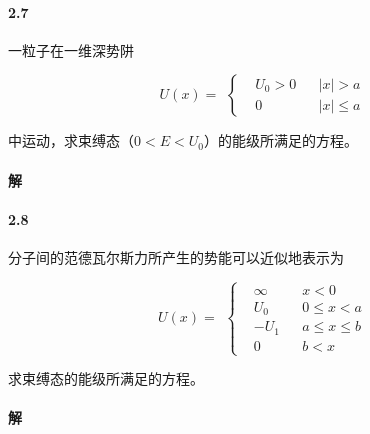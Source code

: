 \documentclass{article}
\begin{document}
\paragraph{2.7}

一粒子在一维深势阱

\begin{equation*}
  \begin{aligned}
    U \left( x \right) =
  \end{aligned}
  \left\{
  \begin{aligned}
    & U_0 > 0 && \left| x \right| > a \\
    & 0 && \left| x \right| \leq a
  \end{aligned}
  \right.
\end{equation*}

中运动，求束缚态（$0<E<U_0$）的能级所满足的方程。

\paragraph{解}

\paragraph{2.8}

分子间的范德瓦尔斯力所产生的势能可以近似地表示为

\begin{equation*}
  \begin{aligned}
    U \left( x  \right) = 
  \end{aligned}
  \left\{
  \begin{aligned}
    & \infty && x<0 \\
    & U_0 && 0 \leq x < a \\
    & - U_1 && a \leq x \leq b \\
    & 0 && b < x
  \end{aligned}
  \right.
\end{equation*}

求束缚态的能级所满足的方程。

\paragraph{解}
\end{document}
